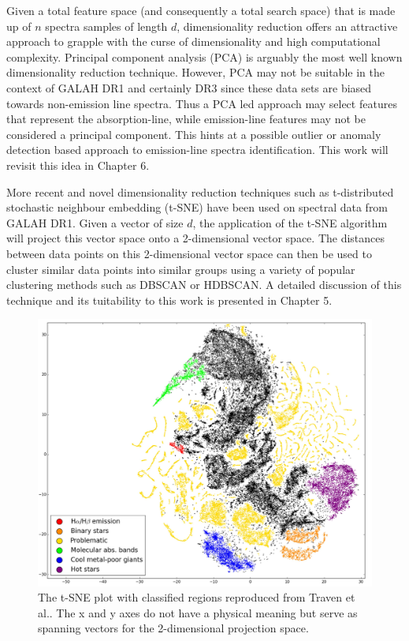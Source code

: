 Given a total feature space (and consequently a total search space) that is made up of $n$ spectra samples of length $d$, dimensionality reduction offers an attractive approach to grapple with the curse of dimensionality and high computational complexity. Principal component analysis (PCA) is arguably the most well known dimensionality reduction technique. However, PCA may not be suitable in the context of GALAH DR1 and certainly DR3 since these data sets are biased towards non-emission line spectra. Thus a PCA led approach may select features that represent the absorption-line, while emission-line features may not be considered a principal component. This hints at a possible outlier or anomaly detection based approach to emission-line spectra identification. This work will revisit this idea in Chapter 6.

More recent and novel dimensionality reduction techniques such as t-distributed stochastic neighbour embedding (t-SNE)\cite{van2008visualizing} have been used on spectral data from GALAH DR1\cite{traven2017galah}. Given a vector of size $d$, the application of the t-SNE algorithm will project this vector space onto a 2-dimensional vector space. The distances between data points on this 2-dimensional vector space can then be used to cluster similar data points into similar groups using a variety of popular clustering methods such as DBSCAN\cite{ester1996density} or HDBSCAN\cite{campello2013density}. A detailed discussion of this technique and its tuitability to this work is presented in Chapter 5.

\begin{figure}[!htb]
\centering
\includegraphics[scale=0.40]{figures/tsne traven.png}
\caption{The t-SNE plot with classified regions reproduced from Traven et al.\cite{traven2017galah}. The x and y axes do not have a physical meaning but serve as spanning vectors for the 2-dimensional projection space.}
\end{figure}

